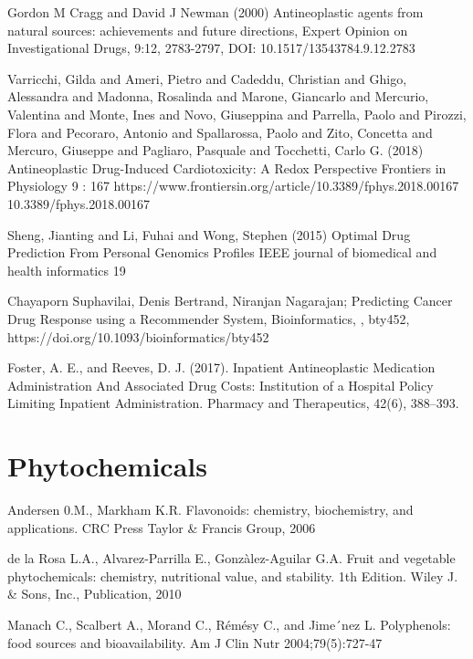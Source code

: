 \begin{thebibliography}{00}
Gordon M Cragg and David J Newman (2000) 
\newblock Antineoplastic agents from natural sources: achievements and future directions, 
\newblock Expert Opinion on Investigational Drugs, 9:12, 2783-2797, DOI: 10.1517/13543784.9.12.2783

Varricchi, Gilda and Ameri, Pietro and Cadeddu, Christian and Ghigo, Alessandra and Madonna, Rosalinda and Marone, Giancarlo and Mercurio, Valentina and Monte, Ines and Novo, Giuseppina and Parrella, Paolo and Pirozzi, Flora and Pecoraro, Antonio and Spallarossa, Paolo and Zito, Concetta and Mercuro, Giuseppe and Pagliaro, Pasquale and Tocchetti, Carlo G. (2018)  
\newblock Antineoplastic Drug-Induced Cardiotoxicity: A Redox Perspective 
\newblock Frontiers in Physiology 9 : 167  https://www.frontiersin.org/article/10.3389/fphys.2018.00167 10.3389/fphys.2018.00167

Sheng, Jianting and Li, Fuhai and Wong, Stephen (2015)
\newblock Optimal Drug Prediction From Personal Genomics Profiles
\newblock IEEE journal of biomedical and health informatics 19

 Chayaporn Suphavilai, Denis Bertrand, Niranjan Nagarajan; 
\newblock Predicting Cancer Drug Response using a Recommender System, 
\newblock Bioinformatics, , bty452, https://doi.org/10.1093/bioinformatics/bty452

Foster, A. E., and Reeves, D. J. (2017). 
\newblock Inpatient Antineoplastic Medication Administration And Associated Drug Costs: Institution of a Hospital Policy Limiting Inpatient Administration. 
\newblock Pharmacy and Therapeutics, 42(6), 388–393.
\section{Phytochemicals}

Andersen 0.M., Markham K.R. 
\newblock Flavonoids: chemistry, biochemistry, and applications. 
\newblock CRC Press Taylor & Francis Group, 2006

de la Rosa L.A., Alvarez-Parrilla E., Gonzàlez-Aguilar G.A. 
\newblock Fruit and vegetable phytochemicals: chemistry, nutritional value, and stability. 
\newblock 1th Edition. Wiley J. & Sons, Inc., Publication, 2010

Manach C., Scalbert A., Morand C., Rémésy C., and Jime´nez L. 
\newblock Polyphenols: food sources and bioavailability. 
\newblock Am J Clin Nutr 2004;79(5):727-47


\end{thebibliography}
